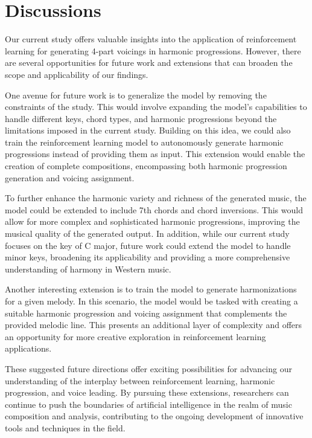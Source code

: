 \documentclass[12pt, letterpaper]{article}
\begin{document}
\section{Discussions}

Our current study offers valuable insights into the application of reinforcement learning for generating 4-part voicings in harmonic progressions. However, there are several opportunities for future work and extensions that can broaden the scope and applicability of our findings.

One avenue for future work is to generalize the model by removing the constraints of the study. This would involve expanding the model's capabilities to handle different keys, chord types, and harmonic progressions beyond the limitations imposed in the current study. Building on this idea, we could also train the reinforcement learning model to autonomously generate harmonic progressions instead of providing them as input. This extension would enable the creation of complete compositions, encompassing both harmonic progression generation and voicing assignment.

To further enhance the harmonic variety and richness of the generated music, the model could be extended to include 7th chords and chord inversions. This would allow for more complex and sophisticated harmonic progressions, improving the musical quality of the generated output. In addition, while our current study focuses on the key of C major, future work could extend the model to handle minor keys, broadening its applicability and providing a more comprehensive understanding of harmony in Western music.

Another interesting extension is to train the model to generate harmonizations for a given melody. In this scenario, the model would be tasked with creating a suitable harmonic progression and voicing assignment that complements the provided melodic line. This presents an additional layer of complexity and offers an opportunity for more creative exploration in reinforcement learning applications.

These suggested future directions offer exciting possibilities for advancing our understanding of the interplay between reinforcement learning, harmonic progression, and voice leading. By pursuing these extensions, researchers can continue to push the boundaries of artificial intelligence in the realm of music composition and analysis, contributing to the ongoing development of innovative tools and techniques in the field.
\end{document}
